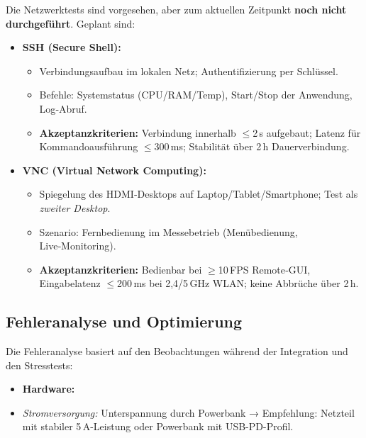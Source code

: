 Die Netzwerktests sind vorgesehen, aber zum aktuellen Zeitpunkt \textbf{noch nicht durchgeführt}. Geplant sind:
\begin{itemize}
	\item \textbf{SSH (Secure Shell):}
	\begin{itemize}
		\item Verbindungsaufbau im lokalen Netz; Authentifizierung per Schlüssel.
		\item Befehle: Systemstatus (CPU/RAM/Temp), Start/Stop der Anwendung, Log‑Abruf.
		\item \textbf{Akzeptanzkriterien:} Verbindung innerhalb \(\leq\)2\,s aufgebaut; Latenz für Kommandoausführung \(\leq\)300\,ms; Stabilität über 2\,h Dauerverbindung.
	\end{itemize}
	\item \textbf{VNC (Virtual Network Computing):}
	\begin{itemize}
		\item Spiegelung des HDMI‑Desktops auf Laptop/Tablet/Smartphone; Test als \emph{zweiter Desktop}.
		\item Szenario: Fernbedienung im Messebetrieb (Menübedienung, Live‑Monitoring).
		\item \textbf{Akzeptanzkriterien:} Bedienbar bei \(\geq\)10\,FPS Remote‑GUI, Eingabelatenz \(\leq\)200\,ms bei 2{,}4/5\,GHz WLAN; keine Abbrüche über 2\,h.
	\end{itemize}
\end{itemize}

\subsection{Fehleranalyse und Optimierung}
\label{cha:Fehleranalyse und Optimierung}

Die Fehleranalyse basiert auf den Beobachtungen während der Integration und den Stresstests:
\begin{itemize}

	\item \textbf{Hardware:}
\end{itemize}
	\begin{itemize}
		\item \emph{Stromversorgung:} Unterspannung durch Powerbank → Empfehlung: Netzteil mit stabiler 5\,A-Leistung oder Powerbank mit USB-PD-Profil.
	\end{itemize}




